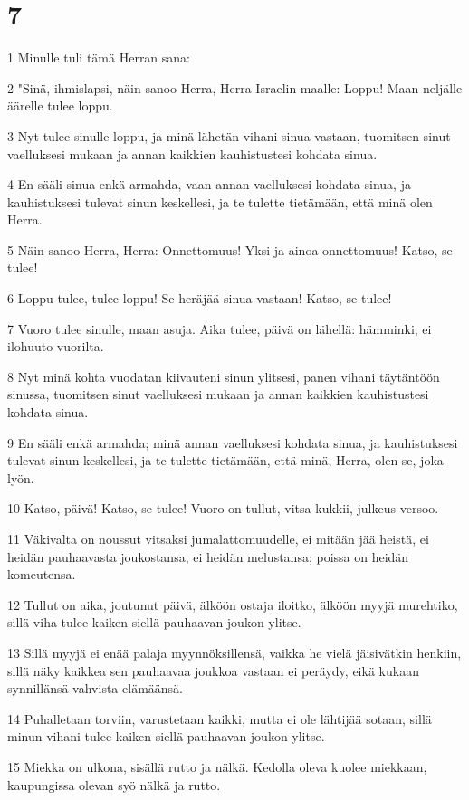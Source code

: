 \chapter{7}

\par 1 Minulle tuli tämä Herran sana:
\par 2 "Sinä, ihmislapsi, näin sanoo Herra, Herra Israelin maalle: Loppu! Maan neljälle äärelle tulee loppu.
\par 3 Nyt tulee sinulle loppu, ja minä lähetän vihani sinua vastaan, tuomitsen sinut vaelluksesi mukaan ja annan kaikkien kauhistustesi kohdata sinua.
\par 4 En sääli sinua enkä armahda, vaan annan vaelluksesi kohdata sinua, ja kauhistuksesi tulevat sinun keskellesi, ja te tulette tietämään, että minä olen Herra.
\par 5 Näin sanoo Herra, Herra: Onnettomuus! Yksi ja ainoa onnettomuus! Katso, se tulee!
\par 6 Loppu tulee, tulee loppu! Se heräjää sinua vastaan! Katso, se tulee!
\par 7 Vuoro tulee sinulle, maan asuja. Aika tulee, päivä on lähellä: hämminki, ei ilohuuto vuorilta.
\par 8 Nyt minä kohta vuodatan kiivauteni sinun ylitsesi, panen vihani täytäntöön sinussa, tuomitsen sinut vaelluksesi mukaan ja annan kaikkien kauhistustesi kohdata sinua.
\par 9 En sääli enkä armahda; minä annan vaelluksesi kohdata sinua, ja kauhistuksesi tulevat sinun keskellesi, ja te tulette tietämään, että minä, Herra, olen se, joka lyön.
\par 10 Katso, päivä! Katso, se tulee! Vuoro on tullut, vitsa kukkii, julkeus versoo.
\par 11 Väkivalta on noussut vitsaksi jumalattomuudelle, ei mitään jää heistä, ei heidän pauhaavasta joukostansa, ei heidän melustansa; poissa on heidän komeutensa.
\par 12 Tullut on aika, joutunut päivä, älköön ostaja iloitko, älköön myyjä murehtiko, sillä viha tulee kaiken siellä pauhaavan joukon ylitse.
\par 13 Sillä myyjä ei enää palaja myynnöksillensä, vaikka he vielä jäisivätkin henkiin, sillä näky kaikkea sen pauhaavaa joukkoa vastaan ei peräydy, eikä kukaan synnillänsä vahvista elämäänsä.
\par 14 Puhalletaan torviin, varustetaan kaikki, mutta ei ole lähtijää sotaan, sillä minun vihani tulee kaiken siellä pauhaavan joukon ylitse.
\par 15 Miekka on ulkona, sisällä rutto ja nälkä. Kedolla oleva kuolee miekkaan, kaupungissa olevan syö nälkä ja rutto.

